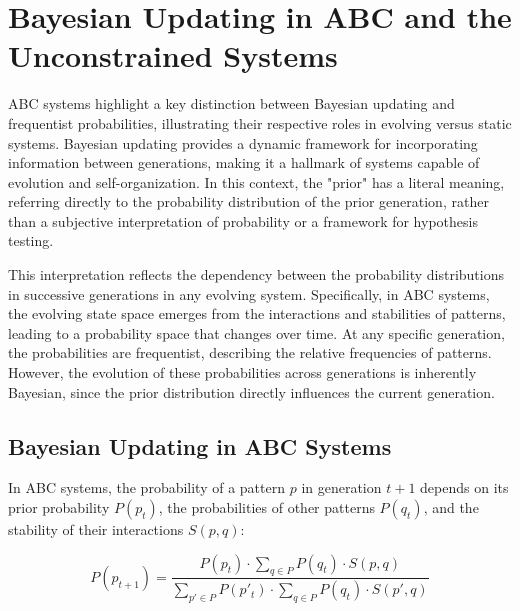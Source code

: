 \documentclass[entropy,article,submit,pdftex,oneauthor]{Definitions/mdpi}
\begin{document}
\section{Bayesian Updating in ABC and the Unconstrained Systems}

ABC systems highlight a key distinction between Bayesian \cite{mcgrayne2011theory} updating and frequentist probabilities, illustrating their respective roles in evolving versus static systems. Bayesian updating provides a dynamic framework for incorporating information between generations, making it a hallmark of systems capable of evolution and self-organization. In this context, the "prior" has a literal meaning, referring directly to the probability distribution of the prior generation, rather than a subjective interpretation of probability or a framework for hypothesis testing.

This interpretation reflects the dependency between the probability distributions in successive generations in any evolving system. Specifically, in ABC systems, the evolving state space emerges from the interactions and stabilities of patterns, leading to a probability space that changes over time. At any specific generation, the probabilities are frequentist, describing the relative frequencies of patterns. However, the evolution of these probabilities across generations is inherently Bayesian, since the prior distribution directly influences the current generation.

\subsection{Bayesian Updating in ABC Systems}

In ABC systems, the probability of a pattern \( p \) in generation \( t+1 \) depends on its prior probability \( P(p_t) \), the probabilities of other patterns \( P(q_t) \), and the stability of their interactions \( S(p, q) \):

\begin{equation}
P(p_{t+1}) = \frac{P(p_t) \cdot \sum_{q \in P} P(q_t) \cdot S(p, q)}{\sum_{p' \in P} P(p'_t) \cdot \sum_{q \in P} P(q_t) \cdot S(p', q)}
\label{eq:bayes}
\end{equation}
\end{document}
